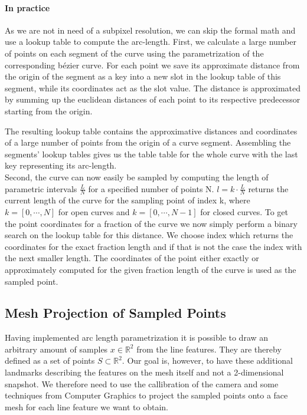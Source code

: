 \paragraph{In practice}
As we are not in need of a subpixel resolution, we can skip the formal math and use a lookup table to compute the arc-length.
First, we calculate a large number of points on each segment of the curve using the parametrization of the corresponding b\'{e}zier curve. For each point we save its approximate distance from the origin of the segment as a key into a new slot in the lookup table of this segment, while its coordinates act as the slot value. The distance is approximated by summing up the euclidean distances of each point to its respective predecessor starting from the origin.\\
\begin{figure}[h!]
\end{figure}
The resulting lookup table contains the approximative distances and coordinates of a large number of points from the origin of a curve segment. Assembling the segments' lookup tables gives us the table table for the whole curve with the last key representing its arc-length.\\ 
Second, the curve can now easily be sampled by computing the length of parametric intervals $\frac{L}{N}$ for a specified number of points N. $l=k \cdot \frac{L}{N}$ returns the current length of the curve for the sampling point of index k, where $k=[0,\cdots,N]$ for open curves and $k=[0,\cdots,N-1]$ for closed curves.
To get the point coordinates for a fraction of the curve we now simply perform a binary search on the lookup table for this distance. We choose index which returns the coordinates for the exact fraction length and if that is not the case the index with the next smaller length. The coordinates of the point either exactly or approximately computed for the given fraction length of the curve is used as the sampled point.

\subsection{Mesh Projection of Sampled Points}
Having implemented arc length parametrization it is possible to draw an arbitrary amount of samples $x \in \mathbb{R}^2$ from the line features. They are thereby defined as a set of points $S \subset \mathbb{R}^2$. Our goal is, however, to have these additional landmarks describing the features on the mesh itself and not a 2-dimensional snapshot.
We therefore need to use the callibration of the camera and some techniques from Computer Graphics to project the sampled points onto a face mesh for each line feature we want to obtain.

